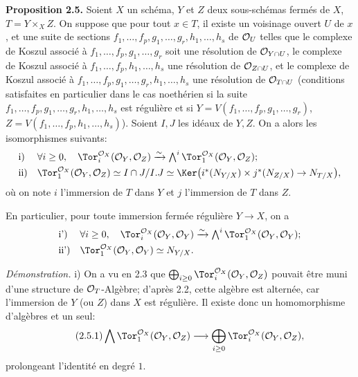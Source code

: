 \textbf{Proposition 2.5.} Soient \(X\) un schéma, \(Y\) et \(Z\) deux sous-schémas fermés de \(X\), \(T=Y\times_X Z\). On suppose que pour tout \(x\in T\), il existe un voisinage ouvert \(U\) de \(x\), et une
suite de sections \(f_1,\ldots,f_p,g_1,\ldots,g_r,h_1,\ldots,h_s\) de \(\mathcal O_U\) telles que le complexe de Koszul associé à \(f_1,\ldots,f_p,g_1,\ldots,g_r\) soit une résolution de \(\mathcal O_{Y\cap U}\), le complexe de Koszul associé à \(f_1,\ldots,f_p,h_1,\ldots,h_s\) une résolution de \(\mathcal O_{Z\cap U}\), et le complexe de Koszul associé à \(f_1,\ldots,f_p,g_1,\ldots,g_r,h_1,\ldots,h_s\) une résolution de \(\mathcal O_{T\cap U}\) (conditions satisfaites en particulier dans le cas noethérien si la suite \(f_1,\ldots,f_p,g_1,\ldots,g_r,h_1,\ldots,h_s\) est régulière et si \(Y=V(f_1,\ldots,f_p,g_1,\ldots,g_r)\), \(Z=V(f_1,\ldots,f_p,h_1,\ldots,h_s)\)). Soient \(I,J\) les idéaux de \(Y,Z\). On a alors les isomorphismes suivants:
\[
\begin{array}{ll}
\text{i)}& \forall i\ge0,\quad
\Tor_i^{\cO_X}(\cO_Y,\cO_Z)\xrightarrow{\sim}
\bigwedge^i\Tor_1^{\cO_X}(\cO_Y,\cO_Z);\\[0.8ex]
\text{ii)}&
\Tor_1^{\cO_X}(\cO_Y,\cO_Z)\simeq
I\cap J/I.J\simeq
\Ker\bigl(i^*(N_{Y/X})\times j^*(N_{Z/X})\to N_{T/X}\bigr),
\end{array}
\]
où on note \(i\) l'immersion de \(T\) dans \(Y\) et \(j\) l'immersion de \(T\) dans \(Z\).

En particulier, pour toute immersion fermée régulière \(Y\to X\), on a
\[
\begin{array}{ll}
\text{i')}& \forall i\ge0,\quad
\Tor_i^{\cO_X}(\cO_Y,\cO_Y)\xrightarrow{\sim}
\bigwedge^i\Tor_1^{\cO_X}(\cO_Y,\cO_Y);\\[0.8ex]
\text{ii')}&
\Tor_1^{\cO_X}(\cO_Y,\cO_Y)\simeq N_{Y/X}.
\end{array}
\]

\emph{Démonstration.} i) On a vu en 2.3 que \(\bigoplus_{i\ge0}\Tor_i^{\cO_X}(\cO_Y,\cO_Z)\) pouvait être muni d'une structure de \(\mathcal O_T\)-Algèbre; d'après 2.2, cette algèbre est alternée, car l'immersion de \(Y\) (ou \(Z\)) dans \(X\) est régulière. Il existe donc un homomorphisme d'algèbres et un seul:
\begin{equation}\tag{2.5.1}
\bigwedge \Tor_1^{\cO_X}(\cO_Y,\cO_Z)\longrightarrow
\bigoplus_{i\ge0}\Tor_i^{\cO_X}(\cO_Y,\cO_Z),
\end{equation}
prolongeant l'identité en degré \(1\).

